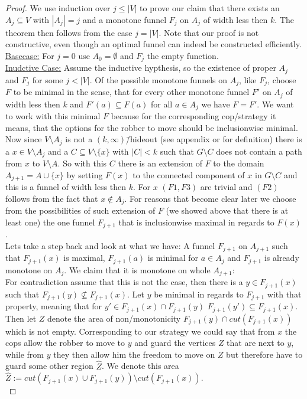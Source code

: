\LemmaVisLazyStratToFunnel*
\begin{proof}
    We use induction over $j \leq |V|$ to prove our claim that there exists an $A_j\subseteq V$ with $|A_j|=j$ and a monotone funnel $F_j$ on $A_j$ of width less then $k$. The theorem then follows from the case $j=|V|$. Note that our proof is not constructive, even though an optimal funnel can indeed be constructed efficiently. \\
    \underline{Basecase:} For $j=0$ use $A_0=\emptyset$ and $F_j$ the empty function.\\
    \underline{Inudctive Case:} Assume the inductive hypthesis, so the existence of proper $A_j$ and $F_j$ for some $j<|V|$. Of the possible monotone funnels on $A_j$, like $F_j$, choose $F$ to be minimal in the sense, that for every other monotone funnel $F'$ on $A_j$ of width less then $k$ and $F'(a)\subseteq F(a)$ for all $a\in A_j$ we have $F=F'$. We want to work with this minimal $F$ because for the corresponding cop\-/strategy it means, that the options for the robber to move should be inclusionwise minimal. \\
    Now since $V\setminus A_j$ is not a $(k,\infty)$\=/hideout (see appendix or \cite{doi:10.1137/090780006} for definition) there is a $x\in V \setminus A_j$ and a $C\subseteq V \setminus \{x\}$ with $|C| < k$ such that $G\setminus C$ does not contain a path from $x$ to $V\setminus A$. So with this $C$ there is an extension of $F$ to the domain $A_{j+1} = A \cup \{x\}$ by setting $F(x)$ to the connected component of $x$ in $G\setminus C$ and this is a funnel of width less then $k$. For $x$ $\mathit{(F1,F3)}$ are trivial and $\mathit{(F2)}$ follows from the fact that $x\notin A_j$.
    For reasons that become clear later we choose from the possibilities of such extension of $F$ (we showed above that there is at least one) the one funnel $F_{j+1}$ that is inclusionwise maximal in regards to $F(x)$. \\
    Lets take a step back and look at what we have: A funnel $F_{j+1}$ on $A_{j+1}$ such that $F_{j+1}(x)$ is maximal, $F_{j+1}(a)$ is minimal for $a\in A_j$ and $F_{j+1}$ is already monotone on $A_j$. We claim that it is monotone on whole $A_{j+1}$:\\
    For contradiction assume that this is not the case, then there is a $y\in F_{j+1}(x)$ such that $F_{j+1}(y)\not\subseteq F_{j+1}(x)$. Let $y$ be minimal in regards to $F_{j+1}$ with that property, meaning that for $y'\in F_{j+1}(x)\cap F_{j+1}(y)$ $F_{j+1}(y')\subseteq F_{j+1}(x)$. Then let $Z$ denote the area of non\-/monotonicity $F_{j+1}(y)\cap cut(F_{j+1}(x))$ which is not empty. Corresponding to our strategy we could say that from $x$ the cops allow the robber to move to $y$ and guard the vertices $Z$ that are next to $y$, while from $y$ they then allow him the freedom to move on $Z$ but therefore have to guard some other region $\hat{Z}$. We denote this area $\hat{Z} := cut(F_{j+1}(x) \cup F_{j+1}(y)) \setminus cut(F_{j+1}(x))$.\\ 

\end{proof}
